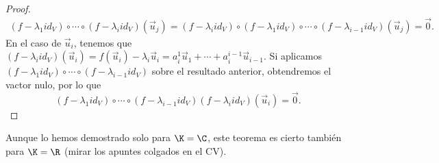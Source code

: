 \begin{proof}
\[\begin{split}
\left(f - \lambda_{1}id _{V}\right)\circ \cdots\circ \left(f - \lambda_{i}id _{V}\right)\left(\vec{u}_{j}\right) = \left(f - \lambda_{i}id _{V}\right)\circ\left(f - \lambda_{1}id _{V}\right)\circ \cdots\circ \left(f - \lambda_{i-1}id _{V}\right)\left(\vec{u}_{j}\right) = \vec{0}.
\end{split}
\]
En el caso de $\displaystyle \vec{u}_{i} $, tenemos que $\displaystyle \left(f - \lambda_{i}id _{V}\right)\left(\vec{u}_{i}\right) = f\left(\vec{u}_{i}\right)-\lambda_{i}\vec{u}_{i} =  a^{1}_{i}\vec{u}_{1} + \cdots + a^{i -1}_{i}\vec{u}_{i-1} $. Si aplicamos $\displaystyle \left(f - \lambda_{1}id _{V}\right) \circ \cdots \circ \left(f - \lambda_{i - 1}id _{V}\right) $ sobre el resultado anterior, obtendremos el vactor nulo, por lo que
\[ \left(f - \lambda_{1}id _{V}\right) \circ \cdots \circ \left(f - \lambda_{i - 1}id _{V}\right)\left(f - \lambda_{i}id _{V}\right)\left(\vec{u}_{i}\right) = \vec{0} .\]
\end{proof}
\begin{observation}
\normalfont Aunque lo hemos demostrado solo para $\displaystyle \K = \C $, este teorema es cierto también para $\displaystyle \K = \R $ (mirar los apuntes colgados en el CV).
\end{observation}
